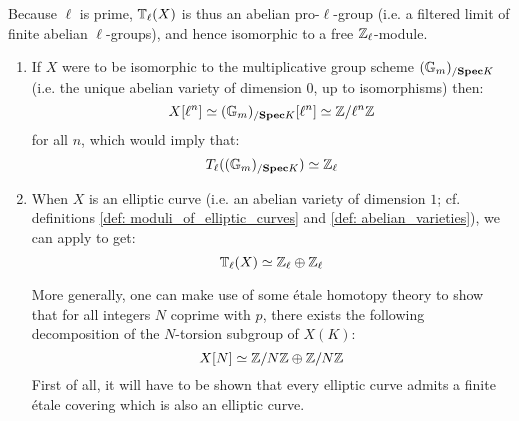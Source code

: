 \begin{example}
\begin{enumerate}
\begin{itemize}
                            Because $\ell$ is prime, $\mathbb{T}_{\ell}(X)$ is thus an abelian pro-$\ell$-group (i.e. a filtered limit of finite abelian $\ell$-groups), and hence isomorphic to a free $\mathbb{Z}_{\ell}$-module. 
                                \begin{enumerate}
                                    \item If $X$ were to be isomorphic to the multiplicative group scheme $(\mathbb{G}_m)_{/\mathbf{Spec} K}$ (i.e. the unique abelian variety of dimension $0$, up to isomorphisms) then:
                                        $$X[\ell^n] \simeq (\mathbb{G}_m)_{/\mathbf{Spec} K}[\ell^n] \simeq \mathbb{Z}/\ell^n\mathbb{Z}$$
                                    for all $n$, which would imply that:
                                        $$T_{\ell}( (\mathbb{G}_m)_{/\mathbf{Spec} K} ) \simeq \mathbb{Z}_{\ell}$$
                                    \item When $X$ is an elliptic curve (i.e. an abelian variety of dimension $1$; cf. definitions \ref{def: moduli_of_elliptic_curves} and \ref{def: abelian_varieties}), we can apply \cite[Corollary 6.4]{silverman_elliptic_curves} to get:
                                        $$\mathbb{T}_{\ell}(X) \simeq \mathbb{Z}_{\ell} \oplus \mathbb{Z}_{\ell}$$
                                    
                                    More generally, one can make use of some \'etale homotopy theory to show that for all integers $N$ coprime with $p$, there exists the following decomposition of the $N$-torsion subgroup of $X(K)$:
                                        $$X[N] \simeq \mathbb{Z}/N\mathbb{Z} \oplus \mathbb{Z}/N\mathbb{Z}$$
                                    First of all, it will have to be shown that every elliptic curve admits a finite \'etale covering which is also an elliptic curve. 
                                \end{enumerate}
                        \end{itemize}
                \end{enumerate}
            \end{example}
        
